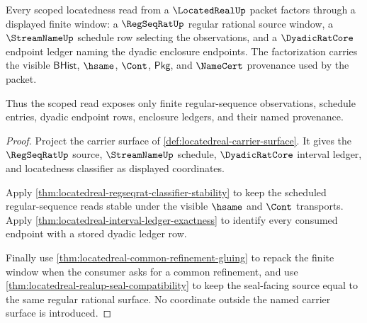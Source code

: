 \begin{theorem}
\label{thm:locatedreal-scope-regseqrat-dyadic-window}
Every scoped locatedness read from a $\LocatedRealUp$ packet factors through a displayed finite window: a $\RegSeqRatUp$ regular rational source window, a $\StreamNameUp$ schedule row selecting the observations, and a $\DyadicRatCore$ endpoint ledger naming the dyadic enclosure endpoints. The factorization carries the visible $\mathsf{BHist}$, $\hsame$, $\Cont$, $\mathsf{Pkg}$, and $\NameCert$ provenance used by the packet.

Thus the scoped read exposes only finite regular-sequence observations, schedule entries, dyadic endpoint rows, enclosure ledgers, and their named provenance.
\end{theorem}
\begin{proof}
Project the carrier surface of \autoref{def:locatedreal-carrier-surface}. It gives the $\RegSeqRatUp$ source, $\StreamNameUp$ schedule, $\DyadicRatCore$ interval ledger, and locatedness classifier as displayed coordinates.

Apply \autoref{thm:locatedreal-regseqrat-classifier-stability} to keep the scheduled regular-sequence reads stable under the visible $\hsame$ and $\Cont$ transports. Apply \autoref{thm:locatedreal-interval-ledger-exactness} to identify every consumed endpoint with a stored dyadic ledger row.

Finally use \autoref{thm:locatedreal-common-refinement-gluing} to repack the finite window when the consumer asks for a common refinement, and use \autoref{thm:locatedreal-realup-seal-compatibility} to keep the seal-facing source equal to the same regular rational surface. No coordinate outside the named carrier surface is introduced.
\end{proof}

